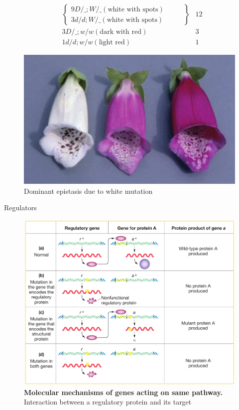 \documentclass[11pt,dvipsnames,ignorenonframetext,aspectratio=169]{beamer}
\begin{document}
\begin{frame}{}
\protect\hypertarget{section-18}{}
\[
\begin{aligned}
& \left\{
\begin{array}{ll}
9D/\_; W/\_ (\textrm{white with spots}) \hspace{1cm} \\
3 d/d; W/\_ (\textrm{white with spots}) \hspace{1cm}
\end{array}
\right\} & 12 \\
& 3 D/\_; w/w (\textrm{dark with red}) \hspace{1cm} & 3 \\
& 1 d/d; w/w (\textrm{light red}) & 1
\end{aligned}
\]
\end{frame}

\begin{frame}{}
\protect\hypertarget{section-19}{}
\begin{figure}

{\centering \includegraphics[width=0.4\linewidth]{./../images/dominant_epistasis} 

}

\caption{Dominant epistasis due to white mutation}\label{fig:dominant-epistasis}
\end{figure}
\end{frame}

\begin{frame}{Regulators}
\protect\hypertarget{regulators}{}
\begin{figure}

{\centering \includegraphics[width=0.48\linewidth]{./../images/genes_in_same_pathway_biochemical} 

}

\caption{\textbf{Molecular mechanisms of genes acting on same pathway.} Interaction between a regulatory protein and its target}\label{fig:functional-regulatory-gene}
\end{figure}
\end{frame}
\end{document}

